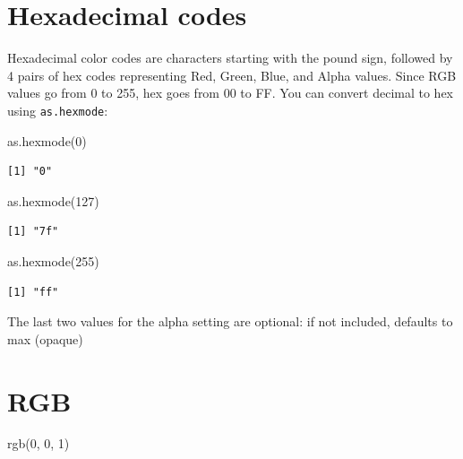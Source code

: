 \documentclass[
]{book}
\newenvironment{Shaded}{\begin{snugshade}}{\end{snugshade}}
\newcommand{\DecValTok}[1]{\textcolor[rgb]{0.00,0.00,0.81}{#1}}
\newcommand{\FunctionTok}[1]{\textcolor[rgb]{0.00,0.00,0.00}{#1}}
\newcommand{\NormalTok}[1]{#1}
\begin{document}
\hypertarget{hexadecimal-codes}{%
\section{Hexadecimal codes}\label{hexadecimal-codes}}

Hexadecimal color codes are characters starting with the pound sign, followed by 4 pairs of hex codes representing Red, Green, Blue, and Alpha values. Since RGB values go from 0 to 255, hex goes from 00 to FF. You can convert decimal to hex using \texttt{as.hexmode}:

\begin{Shaded}
\begin{Highlighting}[]
\FunctionTok{as.hexmode}\NormalTok{(}\DecValTok{0}\NormalTok{)}
\end{Highlighting}
\end{Shaded}

\begin{verbatim}
[1] "0"
\end{verbatim}

\begin{Shaded}
\begin{Highlighting}[]
\FunctionTok{as.hexmode}\NormalTok{(}\DecValTok{127}\NormalTok{)}
\end{Highlighting}
\end{Shaded}

\begin{verbatim}
[1] "7f"
\end{verbatim}

\begin{Shaded}
\begin{Highlighting}[]
\FunctionTok{as.hexmode}\NormalTok{(}\DecValTok{255}\NormalTok{)}
\end{Highlighting}
\end{Shaded}

\begin{verbatim}
[1] "ff"
\end{verbatim}

The last two values for the alpha setting are optional: if not included, defaults to max (opaque)

\hypertarget{rgb}{%
\section{RGB}\label{rgb}}

\begin{Shaded}
\begin{Highlighting}[]
\FunctionTok{rgb}\NormalTok{(}\DecValTok{0}\NormalTok{, }\DecValTok{0}\NormalTok{, }\DecValTok{1}\NormalTok{)}
\end{Highlighting}
\end{Shaded}
\end{document}
